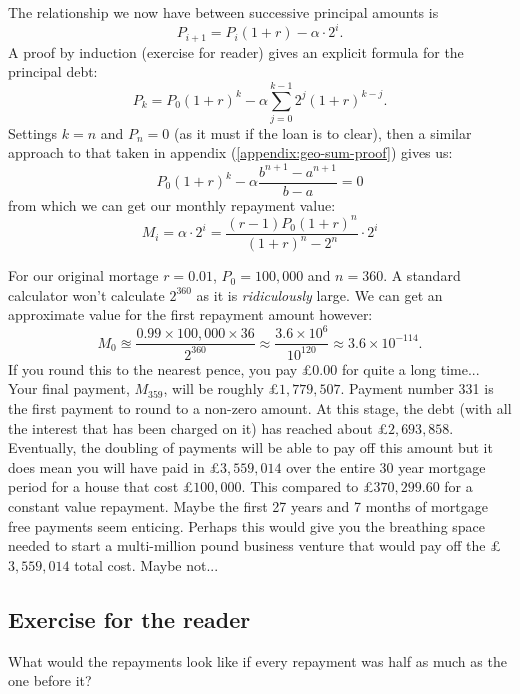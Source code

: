 \documentclass[]{scrartcl}
\theoremstyle{definition}
\let\oldref\ref
\renewcommand{\ref}[1]{(\oldref{#1})}
\begin{document}
The relationship we now have between successive principal amounts is
\[
    P_{i+1} = P_i(1+r) - \alpha\cdot2^i.
\]
A proof by induction (exercise for reader) gives an explicit formula for the principal debt:
\[
    P_k = P_0(1+r)^k - \alpha\sum_{j=0}^{k-1}2^j(1+r)^{k-j}.
\]
Settings $k = n$ and $P_n=0$ (as it must if the loan is to clear), then a similar approach to that taken in appendix \ref{appendix:geo-sum-proof} gives us:
\[
    P_0(1+r)^k - \alpha\frac{b^{n+1} - a^{n+1}}{b-a} = 0
\]
from which we can get our monthly repayment value:
\[
    M_i = \alpha\cdot2^i = \frac{(r-1)P_0(1+r)^n}{(1+r)^n - 2^n} \cdot 2^i
\]

For our original mortage $r=0.01$, $P_0=100,000$ and $n=360$. A standard calculator won't calculate $2^{360}$ as it is \textit{ridiculously} large. We can get an approximate value for the first repayment amount however:
\[
    M_0 \approxeq \frac{0.99 \times 100,000 \times 36}{2^{360}} \approx 
    \frac{3.6\times10^6}{10^{120}} \approx 3.6 \times 10^{-114}.
\]
If you round this to the nearest pence, you pay £$0.00$ for quite a long time... Your final payment, $M_{359}$, will be roughly £$1,779,507$. Payment number 331 is the first payment to round to a non-zero amount. At this stage, the debt (with all the interest that has been charged on it) has reached about £$2,693,858$. Eventually, the doubling of payments will be able to pay off this amount but it does mean you will have paid in £$3,559,014$ over the entire 30 year mortgage period for a house that cost £$100, 000$. This compared to £$370, 299.60$ for a constant value repayment. Maybe the first 27 years and 7 months of mortgage free payments seem enticing. Perhaps this would give you the breathing space needed to start a multi-million pound business venture that would pay off the £$3,559,014$ total cost. Maybe not...

\subsection{Exercise for the reader}
What would the repayments look like if every repayment was half as much as the one before it?

\pagebreak
\appendix
\end{document}
